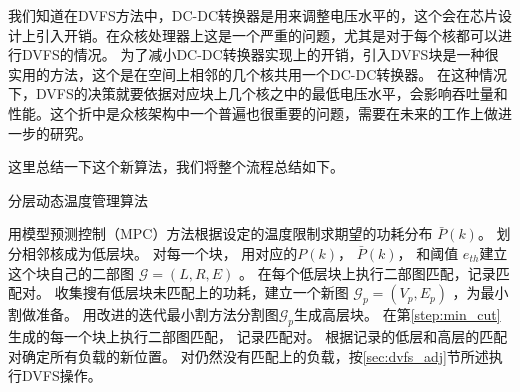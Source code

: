 我们知道在DVFS方法中，DC-DC转换器是用来调整电压水平的，这个会在芯片设计上引入开销。在众核处理器上这是一个严重的问题，尤其是对于每个核都可以进行DVFS的情况。
为了减小DC-DC转换器实现上的开销，引入DVFS块是一种很实用的方法，这个是在空间上相邻的几个核共用一个DC-DC转换器。
在这种情况下，DVFS的决策就要依据对应块上几个核之中的最低电压水平，会影响吞吐量和性能。这个折中是众核架构中一个普遍也很重要的问题，需要在未来的工作上做进一步的研究。

这里总结一下这个新算法，我们将整个流程总结如下。

\begin{algorithm}[H]
\caption{分层动态温度管理算法}
\label{alg:whole_flow}
\begin{algorithmic}[1]
  \STATE 用模型预测控制（MPC）方法根据设定的温度限制求期望的功耗分布 $\bar{P}(k)$。
  \STATE 划分相邻核成为低层块。
  \STATE 对每一个块， 用对应的$P(k)$， $\bar{P}(k)$，  和阈值 $e_{th}$建立这个块自己的二部图 $\mathcal{G} =
  (L, R, E)$ 。
   \STATE 在每个低层块上执行二部图匹配，记录匹配对。
   \STATE 收集搜有低层块未匹配上的功耗，建立一个新图 $\mathcal{G}_p = (V_p, E_p)$ ，为最小割做准备。
   \STATE 用改进的迭代最小割方法分割图$\mathcal{G}_p$生成高层块。  \label{step:min_cut}
   \STATE 在第\ref{step:min_cut}生成的每一个块上执行二部图匹配，
   记录匹配对。
   \STATE 根据记录的低层和高层的匹配对确定所有负载的新位置。 
   \STATE 对仍然没有匹配上的负载，按\ref{sec:dvfs_adj}节所述执行DVFS操作。
\end{algorithmic}
\end{algorithm}















































